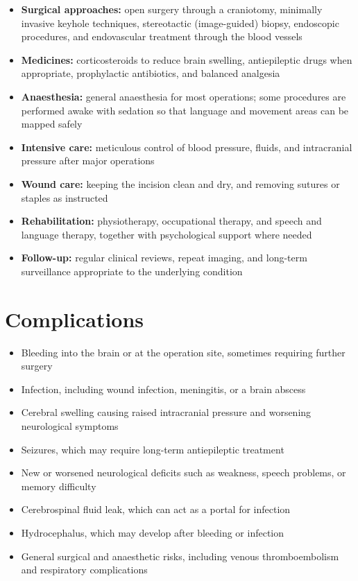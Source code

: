 \begin{itemize}
    \item \textbf{Surgical approaches:} open surgery through a craniotomy, minimally invasive keyhole techniques, stereotactic (image-guided) biopsy, endoscopic procedures, and endovascular treatment through the blood vessels
    \item \textbf{Medicines:} corticosteroids to reduce brain swelling, antiepileptic drugs when appropriate, prophylactic antibiotics, and balanced analgesia
    \item \textbf{Anaesthesia:} general anaesthesia for most operations; some procedures are performed awake with sedation so that language and movement areas can be mapped safely
    \item \textbf{Intensive care:} meticulous control of blood pressure, fluids, and intracranial pressure after major operations
    \item \textbf{Wound care:} keeping the incision clean and dry, and removing sutures or staples as instructed
    \item \textbf{Rehabilitation:} physiotherapy, occupational therapy, and speech and language therapy, together with psychological support where needed
    \item \textbf{Follow-up:} regular clinical reviews, repeat imaging, and long-term surveillance appropriate to the underlying condition
\end{itemize}

\section*{Complications}
\begin{itemize}
    \item Bleeding into the brain or at the operation site, sometimes requiring further surgery
    \item Infection, including wound infection, meningitis, or a brain abscess
    \item Cerebral swelling causing raised intracranial pressure and worsening neurological symptoms
    \item Seizures, which may require long-term antiepileptic treatment
    \item New or worsened neurological deficits such as weakness, speech problems, or memory difficulty
    \item Cerebrospinal fluid leak, which can act as a portal for infection
    \item Hydrocephalus, which may develop after bleeding or infection
    \item General surgical and anaesthetic risks, including venous thromboembolism and respiratory complications
\end{itemize}

